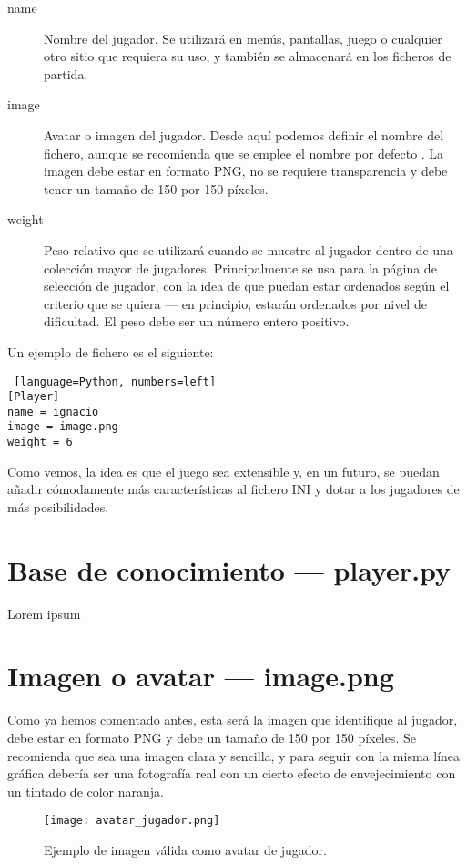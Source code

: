 \begin{description}
    \item[name] Nombre del jugador. Se utilizará en menús, pantallas, juego o cualquier otro sitio que requiera su uso,
        y también se almacenará en los ficheros de partida.
    \item[image] Avatar o imagen del jugador. Desde aquí podemos definir el nombre del fichero, aunque se recomienda que
        se emplee el nombre por defecto . La imagen debe estar en formato PNG, no se requiere transparencia
        y debe tener un tamaño de 150 por 150 píxeles.
    \item[weight] Peso relativo que se utilizará cuando se muestre al jugador dentro de una colección mayor de jugadores.
        Principalmente se usa para la página de selección de jugador, con la idea de que puedan estar ordenados según
        el criterio que se quiera --- en principio, estarán ordenados por nivel de dificultad. El peso debe ser un número
        entero positivo.
\end{description}

Un ejemplo de fichero es el siguiente:

\begin{lstlisting} [language=Python, numbers=left]
[Player]
name = ignacio
image = image.png
weight = 6
\end{lstlisting}

Como vemos, la idea es que el juego sea extensible y, en un futuro, se puedan añadir cómodamente más características
al fichero INI y dotar a los jugadores de más posibilidades.


\section{Base de conocimiento --- player.py}

Lorem ipsum

\section{Imagen o avatar --- image.png}

Como ya hemos comentado antes, esta será la imagen que identifique al jugador, debe estar en formato PNG y debe un tamaño
de 150 por 150 píxeles. Se recomienda que sea una imagen clara y sencilla, y para seguir con la misma línea gráfica debería
ser una fotografía real con un cierto efecto de envejecimiento con un tintado de color naranja.

\begin{figure}[h]
  \begin{center}
    \texttt{[image: avatar\_jugador.png]}
  \end{center}
  \caption{Ejemplo de imagen válida como avatar de jugador.}
  \label{fig:avatar_jugador}
\end{figure}


